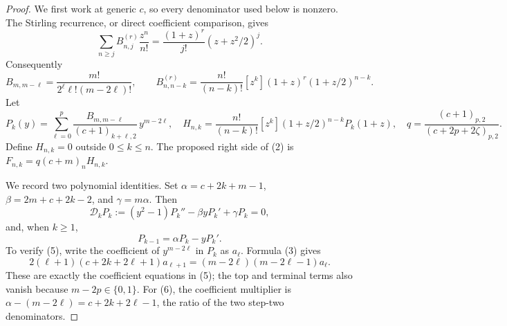 \documentclass[10pt]{article}
\newcommand{\rise}[2]{(#1)_{#2}}
\newcommand{\step}[2]{(#1)_{#2,2}}
\begin{document}
\begin{proof}
We first work at generic \(c\), so every denominator used below is nonzero.
The Stirling recurrence, or direct coefficient comparison, gives
\[
 \sum_{n\ge j}B^{(r)}_{n,j}\frac{z^n}{n!}
   =\frac{(1+z)^r}{j!}(z+z^2/2)^j.
\]
Consequently
\[
 B_{m,m-\ell}=\frac{m!}{2^\ell\ell!(m-2\ell)!},\qquad
 B^{(r)}_{n,n-k}=\frac{n!}{(n-k)!}
        [z^k](1+z)^r(1+z/2)^{n-k}.                \tag{3}
\]
Let
\[
 P_k(y)=\sum_{\ell=0}^p
   \frac{B_{m,m-\ell}}{\step{c+1}{k+\ell}}\,y^{m-2\ell},
 \quad
 H_{n,k}=\frac{n!}{(n-k)!}[z^k](1+z/2)^{n-k}P_k(1+z),
 \quad
 q=\frac{\step{c+1}p}{\step{c+2p+2\zeta}p}.        \tag{4}
\]
Define \(H_{n,k}=0\) outside \(0\le k\le n\).
The proposed right side of (2) is \(F_{n,k}=q\rise{c+m}n H_{n,k}\).

We record two polynomial identities. Set
\(\alpha=c+2k+m-1\), \(\beta=2m+c+2k-2\), and \(\gamma=m\alpha\).
Then
\[
 \mathcal D_kP_k:=(y^2-1)P_k''-\beta yP_k'+\gamma P_k=0, \tag{5}
\]
and, when \(k\ge1\),
\[
 P_{k-1}=\alpha P_k-yP_k'.                       \tag{6}
\]
To verify (5), write the coefficient of \(y^{m-2\ell}\) in \(P_k\)
as \(a_\ell\). Formula (3) gives
\[
 2(\ell+1)(c+2k+2\ell+1)a_{\ell+1}
    =(m-2\ell)(m-2\ell-1)a_\ell .
\]
These are exactly the coefficient equations in (5);
the top and terminal terms also vanish because \(m-2p\in\{0,1\}\).
For (6), the coefficient multiplier is
\(\alpha-(m-2\ell)=c+2k+2\ell-1\), the ratio of the two
step-two denominators.


\end{proof}
\end{document}

